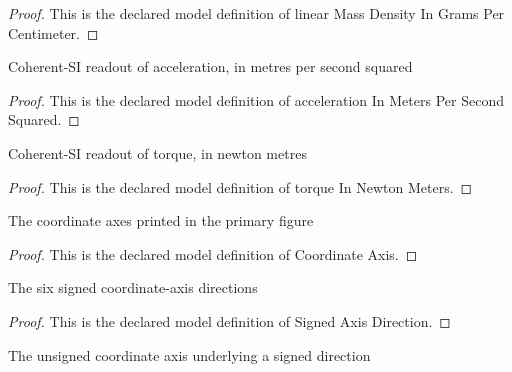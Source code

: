 \begin{proof}
  This is the declared model definition of linear Mass Density In Grams Per Centimeter.
\end{proof}
\begin{definition}
  \label{def:physics:phyx-mini-0948:phyxminiproblems-problemphyxmini0948-accelerationinmeterspersecondsquared}
  Coherent-SI readout of acceleration, in metres per second squared
\end{definition}
\begin{proof}
  This is the declared model definition of acceleration In Meters Per Second Squared.
\end{proof}
\begin{definition}
  \label{def:physics:phyx-mini-0948:phyxminiproblems-problemphyxmini0948-torqueinnewtonmeters}
  Coherent-SI readout of torque, in newton metres
\end{definition}
\begin{proof}
  This is the declared model definition of torque In Newton Meters.
\end{proof}
\begin{definition}
  \label{def:physics:phyx-mini-0948:phyxminiproblems-problemphyxmini0948-coordinateaxis}
  The coordinate axes printed in the primary figure
\end{definition}
\begin{proof}
  This is the declared model definition of Coordinate Axis.
\end{proof}
\begin{definition}
  \label{def:physics:phyx-mini-0948:phyxminiproblems-problemphyxmini0948-signedaxisdirection}
  The six signed coordinate-axis directions
\end{definition}
\begin{proof}
  This is the declared model definition of Signed Axis Direction.
\end{proof}
\begin{definition}[axis]
  \label{def:physics:phyx-mini-0948:phyxminiproblems-problemphyxmini0948-signedaxisdirection-axis}
  The unsigned coordinate axis underlying a signed direction
\end{definition}
